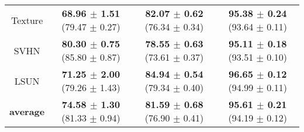 \documentclass{article}
\begin{document}
\begin{table}[!thp]
{\begin{tabular}{c|ccc}
Texture            & \textbf{68.96 $\pm$ 1.51} (79.47 $\pm$ 0.27) & \textbf{82.07 $\pm$ 0.62} (76.34 $\pm$ 0.34) & \textbf{95.38 $\pm$ 0.24} (93.64 $\pm$ 0.11) \\
SVHN               & \textbf{80.30 $\pm$ 0.75} (85.80 $\pm$ 0.87) & \textbf{78.55 $\pm$ 0.63} (73.61 $\pm$ 0.37) & \textbf{95.11 $\pm$ 0.18} (93.51 $\pm$ 0.10) \\
LSUN             & \textbf{71.25 $\pm$ 2.00} (79.26 $\pm$ 1.43) & \textbf{84.94 $\pm$ 0.54} (79.34 $\pm$ 0.40) & \textbf{96.65 $\pm$ 0.12} (94.99 $\pm$ 0.11) \\
\midrule
\textbf{average}   & \textbf{74.58 $\pm$ 1.30} (81.33 $\pm$ 0.94) & \textbf{81.59 $\pm$ 0.68} (76.90 $\pm$ 0.41) & \textbf{95.61 $\pm$ 0.21} (94.19 $\pm$ 0.12) \\ \bottomrule[1.5pt]      
\end{tabular}
}
\end{table}
\end{document}
